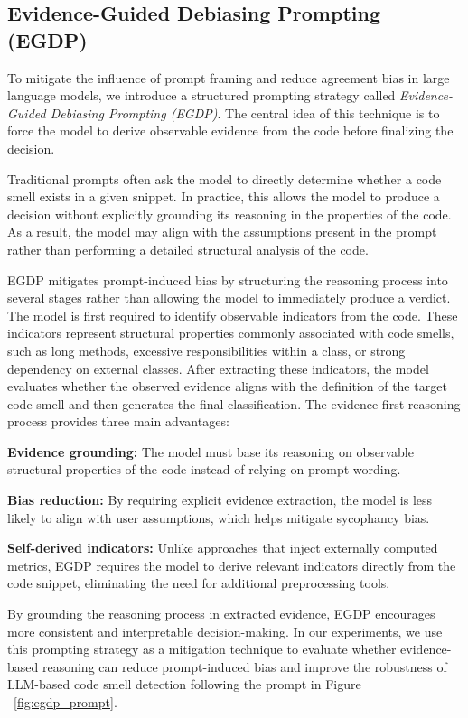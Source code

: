 \documentclass[sigconf,review,anonymous]{acmart}
\begin{document}
\subsection{Evidence-Guided Debiasing Prompting (EGDP)}

To mitigate the influence of prompt framing and reduce agreement bias in large language models, we introduce a structured prompting strategy called \textit{Evidence-Guided Debiasing Prompting (EGDP)}. The central idea of this technique is to force the model to derive observable evidence from the code before finalizing the decision. 

Traditional prompts often ask the model to directly determine whether a code smell exists in a given snippet. In practice, this allows the model to produce a decision without explicitly grounding its reasoning in the properties of the code. As a result, the model may align with the assumptions present in the prompt rather than performing a detailed structural analysis of the code.

EGDP mitigates prompt-induced bias by structuring the reasoning process into several stages rather than allowing the model to immediately produce a verdict. The model is first required to identify observable indicators from the code. These indicators represent structural properties commonly associated with code smells, such as long methods, excessive responsibilities within a class, or strong dependency on external classes. After extracting these indicators, the model evaluates whether the observed evidence aligns with the definition of the target code smell and then generates the final classification. The evidence-first reasoning process provides three main advantages:

\textbf{Evidence grounding:} The model must base its reasoning on observable structural properties of the code instead of relying on prompt wording.

\textbf{Bias reduction:} By requiring explicit evidence extraction, the model is less likely to align with user assumptions, which helps mitigate sycophancy bias.

\textbf{Self-derived indicators:} Unlike approaches that inject externally computed metrics, EGDP requires the model to derive relevant indicators directly from the code snippet, eliminating the need for additional preprocessing tools.

By grounding the reasoning process in extracted evidence, EGDP encourages more consistent and interpretable decision-making. In our experiments, we use this prompting strategy as a mitigation technique to evaluate whether evidence-based reasoning can reduce prompt-induced bias and improve the robustness of LLM-based code smell detection following the prompt in Figure ~\ref{fig:egdp_prompt}.
\end{document}
